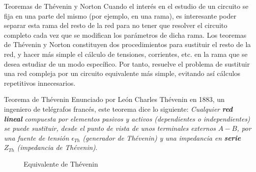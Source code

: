 \documentclass[11pt]{book} %
\makeatletter
\numberwithin{dummy}{section}
\theoremstyle{ocrenumbox}
\theoremstyle{blacknumex}
\theoremstyle{blacknumbox}
\theoremstyle{ocrenum}
\renewcommand{\section}{\@startsection{section}{1}{\z@}
{-4ex \@plus -1ex \@minus -.4ex}
{1ex \@plus.2ex }
{\normalfont\large\sffamily\bfseries}}
\renewcommand{\subsection}{\@startsection {subsection}{2}{\z@}
{-3ex \@plus -0.1ex \@minus -.4ex}
{0.5ex \@plus.2ex }
{\normalfont\sffamily\bfseries}}
\newlength\esp
\makeatother
\begin{document}


\section{Teoremas de Thévenin y Norton}
Cuando el interés en el estudio de un circuito se fija en una parte del mismo (por ejemplo, en una rama), es interesante poder separar esta rama del resto de la red para no tener que resolver el circuito completo cada vez que se modifican los parámetros de dicha rama.  Los teoremas de Thévenin y Norton constituyen dos procedimientos para sustituir el resto de la red, y hacer más simple el cálculo de tensiones, corrientes, etc. en la rama que se desea estudiar de un modo específico. Por tanto, resuelve el problema de sustituir una red compleja por un circuito equivalente más simple, evitando así cálculos repetitivos innecesarios. 

\subsection{Teorema de Thévenin}
Enunciado por León Charles Thévenin en 1883, un ingeniero de telégrafos francés, este teorema dice lo siguiente:  \textit{Cualquier \textbf{red lineal} compuesta por elementos pasivos y activos (dependientes o independientes) se puede sustituir, desde el punto de vista de unos terminales externos $A-B$, por una fuente de tensión $\epsilon_{Th}$ (generador de Thévenin) y una impedancia en \textbf{serie} $Z_{Th}$ (impedancia de Thévenin)}.
\begin{figure}[htbp]
        \centering
        \hfil
        \caption{Equivalente de Thévenin}
        \label{fig.thevenin}
    \end{figure}
    
\end{document}
